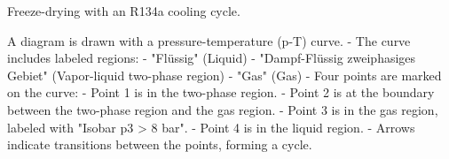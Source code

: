 Freeze-drying with an R134a cooling cycle.  

A diagram is drawn with a pressure-temperature (p-T) curve.  
- The curve includes labeled regions:  
  - "Flüssig" (Liquid)  
  - "Dampf-Flüssig zweiphasiges Gebiet" (Vapor-liquid two-phase region)  
  - "Gas" (Gas)  
- Four points are marked on the curve:  
  - Point 1 is in the two-phase region.  
  - Point 2 is at the boundary between the two-phase region and the gas region.  
  - Point 3 is in the gas region, labeled with "Isobar p3 > 8 bar".  
  - Point 4 is in the liquid region.  
- Arrows indicate transitions between the points, forming a cycle.
